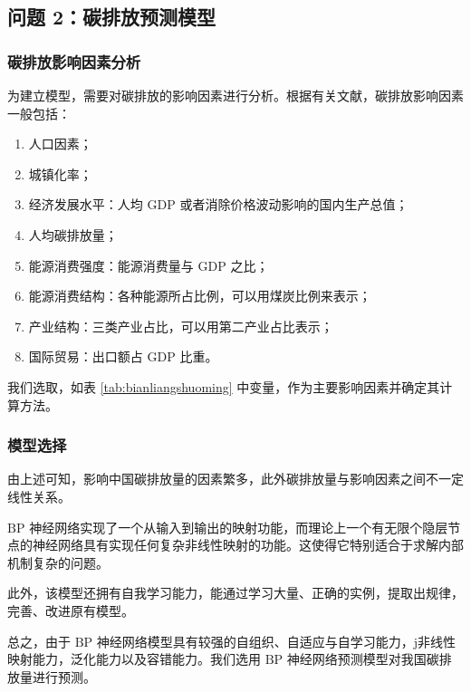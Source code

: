 \subsection{问题 2：碳排放预测模型}

  \subsubsection{碳排放影响因素分析}
    为建立模型，需要对碳排放的影响因素进行分析。根据有关文献，碳排放影响因素一般包括\cite{NCEPU2019}：
    \begin{enumerate}
      \item 人口因素；
      \item 城镇化率；
      \item 经济发展水平：人均 $\mathrm{GDP}$ 或者消除价格波动影响的国内生产总值；
      \item 人均碳排放量；
      \item 能源消费强度：能源消费量与 $\mathrm{GDP}$ 之比；
      \item 能源消费结构：各种能源所占比例，可以用煤炭比例来表示；
      \item 产业结构：三类产业占比，可以用第二产业占比表示；
      \item 国际贸易：出口额占 $\mathrm{GDP}$ 比重。
    \end{enumerate}
    我们选取，如表 \ref{tab:bianliangshuoming} 中变量，作为主要影响因素并确定其计算方法。

  \subsubsection{模型选择}
    由上述可知，影响中国碳排放量的因素繁多，此外碳排放量与影响因素之间不一定线性关系。

    $\mathrm{BP}$ 神经网络实现了一个从输入到输出的映射功能，而理论上一个有无限个隐层节点的神经网络具有实现任何复杂非线性映射的功能。这使得它特别适合于求解内部机制复杂的问题。\cite{liuzhongqi2010}

    此外，该模型还拥有自我学习能力，能通过学习大量、正确的实例，提取出规律，完善、改进原有模型。

    总之，由于 $\mathrm{BP}$ 神经网络模型具有较强的自组织、自适应与自学习能力，j非线性映射能力，泛化能力以及容错能力。我们选用 $\mathrm{BP}$ 神经网络预测模型对我国碳排放量进行预测。

